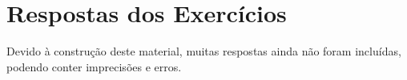 \chapter*{Respostas dos Exercícios}

Devido à construção deste material, muitas respostas ainda não foram incluídas, podendo conter imprecisões e erros.

\setlength{\columnseprule}{1pt}

\begin{multicols}{2}
\shipoutAnswer
\end{multicols}

\setlength{\columnseprule}{0pt}


